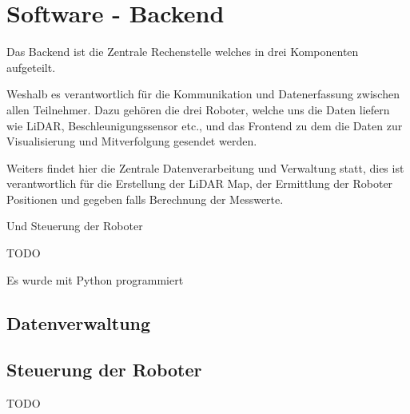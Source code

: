 
\section{Software - Backend}
\label{sec:software_backend}
Das Backend ist die Zentrale Rechenstelle welches in drei Komponenten aufgeteilt.

Weshalb es verantwortlich für die Kommunikation und Datenerfassung zwischen allen Teilnehmer. 
Dazu gehören die drei Roboter, welche uns die Daten liefern wie LiDAR, Beschleunigungssensor etc., 
und das Frontend zu dem die Daten zur Visualisierung und Mitverfolgung gesendet werden.

Weiters findet hier die Zentrale Datenverarbeitung und Verwaltung statt, 
dies ist verantwortlich für die Erstellung der LiDAR Map, 
der Ermittlung der Roboter Positionen 
und gegeben falls Berechnung der Messwerte. 

Und Steuerung der Roboter

TODO

Es wurde mit Python programmiert

\subsection{Datenverwaltung}
\label{subsec:backend_data}


\subsection{Steuerung der Roboter}
\label{subsec:backend_robot_detection}
TODO 
